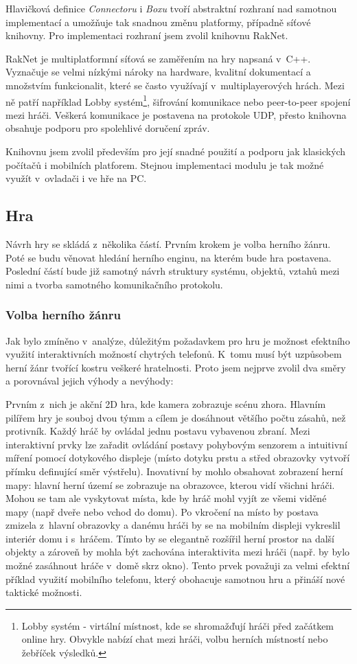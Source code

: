 \documentclass[thesis=B,czech,hidelinks]{FITthesis}[2012/06/26] %
\begin{document}
Hlavičková definice \textit{Connectoru} i \textit{Boxu} tvoří abstraktní rozhraní nad samotnou implementací a umožňuje tak snadnou změnu platformy, případně síťové knihovny. Pro implementaci rozhraní jsem zvolil knihovnu RakNet.

RakNet je multiplatformní síťová se zaměřením na hry napsaná v~C++. Vyznačuje se velmi nízkými nároky na hardware, kvalitní dokumentací a množstvím funkcionalit, které se často využívají v~multiplayerových hrách. \cite{raknet} Mezi ně patří například Lobby systém\footnote{Lobby systém - virtální místnost, kde se shromažďují hráči před začátkem online hry. Obvykle nabízí chat mezi hráči, volbu herních místností nebo žebříček výsledků.}, šifrování komunikace nebo peer-to-peer spojení mezi hráči. Veškerá komunikace je postavena na protokole UDP, přesto knihovna obsahuje podporu pro spolehlivé doručení zpráv.

Knihovnu jsem zvolil především pro její snadné použití a podporu jak klasických počítačů i mobilních platforem. Stejnou implementaci modulu je tak možné využít v~ovladači i ve hře na PC.

\subsection{Hra}

Návrh hry se skládá z~několika částí. Prvním krokem je volba herního žánru. Poté se budu věnovat hledání herního enginu, na kterém bude hra postavena. Poslední částí bude již samotný návrh struktury systému, objektů, vztahů mezi nimi a tvorba samotného komunikačního protokolu.

\subsubsection{Volba herního žánru}

Jak bylo zmíněno v~analýze, důležitým požadavkem pro hru je možnost efektního využití interaktivních možností chytrých telefonů. K~tomu musí být uzpůsobem herní žánr tvořící kostru veškeré hratelnosti. Proto jsem nejprve zvolil dva směry a porovnával jejich výhody a nevýhody:

Prvním z~nich je akční 2D hra, kde kamera zobrazuje scénu zhora. Hlavním pilířem hry je souboj dvou týmm a cílem je dosáhnout většího počtu zásahů, než protivník. Každý hráč by ovládal jednu postavu vybavenou zbraní. Mezi interaktivní prvky lze zařadit ovládání postavy pohybovým senzorem a intuitivní míření pomocí dotykového displeje (místo dotyku prstu a střed obrazovky vytvoří přímku definující směr výstřelu). Inovativní by mohlo obsahovat zobrazení herní mapy: hlavní herní území se zobrazuje na obrazovce, kterou vidí všichni hráči. Mohou se tam ale vyskytovat místa, kde by hráč mohl vyjít ze všemi viděné mapy (např dveře nebo vchod do domu). Po vkročení na místo by postava zmizela z~hlavní obrazovky a danému hráči by se na mobilním displeji vykreslil interiér domu i s~hráčem. Tímto by se elegantně rozšířil herní prostor na další objekty a zároveň by mohla být zachována interaktivita mezi hráči (např. by bylo možné zasáhnout hráče v~domě skrz okno). Tento prvek považuji za velmi efektní příklad využití mobilního telefonu, který obohacuje samotnou hru a přináší nové taktické možnosti.
\end{document}
